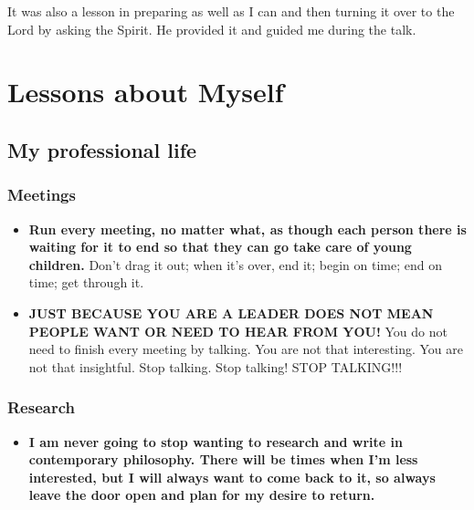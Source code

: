 		It was also a lesson in preparing as well as I can and then turning it over to the Lord by asking the Spirit. He provided it and guided me during the talk.

\section{Lessons about Myself}
	\label{LESSONS-ME}
	
	\subsection{My professional life}
	
		\subsubsection{Meetings}
		
			\begin{itemize}
			
				\item \textbf{Run every meeting, no matter what, as though each person there is waiting for it to end so that they can go take care of young children.} Don't drag it out; when it's over, end it; begin on time; end on time; get through it.
				
				\item \textbf{JUST BECAUSE YOU ARE A LEADER DOES NOT MEAN PEOPLE WANT OR NEED TO HEAR FROM YOU!} You do not need to finish every meeting by talking. You are not that interesting. You are not that insightful. Stop talking. Stop talking! STOP TALKING!!!
			
			\end{itemize}
	
		\subsubsection{Research}
	
			\begin{itemize}
			
				\item \textbf{I am never going to stop wanting to research and write in contemporary philosophy. There will be times when I'm less interested, but I will always want to come back to it, so always leave the door open and plan for my desire to return.}
			
			\end{itemize}
			
